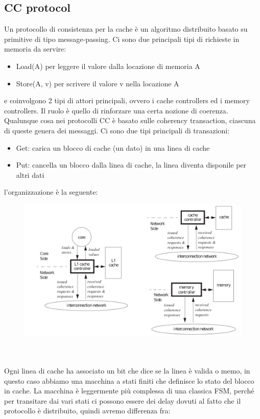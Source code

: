 \documentclass[12pt, oneside]{extbook} %
\begin{document}
\subsection{CC protocol}
Un protocollo di consistenza per la cache è un algoritmo distribuito basato su primitive di tipo message-passing. Ci sono due principali tipi di richieste in memoria da servire:
\begin{itemize}
\item Load(A) per leggere il valore dalla locazione di memoria A
\item Store(A, v) per scrivere il valore v nella locazione A
\end{itemize}
e coinvolgono 2 tipi di attori principali, ovvero i cache controllers ed i memory controllers. Il ruolo è quello di rinforzare una certa nozione di coerenza.\\ Qualunque cosa nei protocolli CC è basato sulle coherency transaction, ciascuna di queste genera dei messaggi. Ci sono due tipi principali di transazioni:
\begin{itemize}
\item Get: carica un blocco di cache (un dato) in una linea di cache
\item Put: cancella un blocco dalla linea di cache, la linea diventa disponile per altri dati
\end{itemize}
l'organizzazione è la seguente:\\
\begin{figure}[!h]
	\includegraphics[scale=0.3]{immagini/cc_arch.png}
\end{figure}\\\\
Ogni linea di cache ha associato un bit che dice se la linea è valida o memo, in questo caso abbiamo una macchina a stati finiti che definisce lo stato del blocco in cache. La macchina è leggermente più complessa di una classica FSM, perché per transitare dai vari stati ci possono essere dei delay dovuti al fatto che il protocollo è distribuito, quindi avremo differenza fra:
\end{document}
